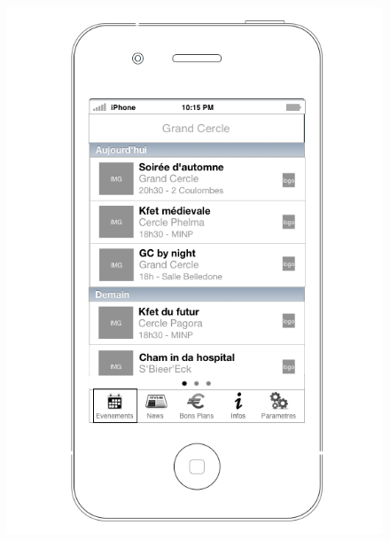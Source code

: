 \documentclass[a4paper, 11px]{article}
\begin{document}
\begin{figure}[htbp]
\begin{minipage}[c]{.50\linewidth}
\begin{center}
			\includegraphics[scale=0.3]{../../Sketch/iOS/evenements_liste.png}
		\end{center}
	\end{minipage}
\end{figure}
\end{document}
